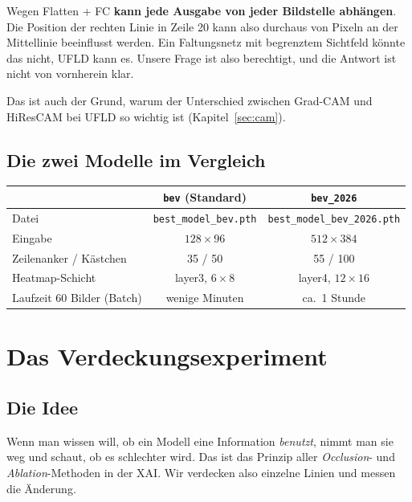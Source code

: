 \documentclass[11pt,a4paper]{article}
\newcommand{\code}[1]{\texttt{#1}}
\begin{document}
\begin{merke}
Wegen Flatten + FC \textbf{kann jede Ausgabe von jeder Bildstelle abhängen}. Die Position der
rechten Linie in Zeile 20 kann also durchaus von Pixeln an der Mittellinie beeinflusst werden.
Ein Faltungsnetz mit begrenztem Sichtfeld könnte das nicht, UFLD kann es. Unsere Frage ist also
berechtigt, und die Antwort ist nicht von vornherein klar.
\end{merke}

Das ist auch der Grund, warum der Unterschied zwischen Grad-CAM und HiResCAM bei UFLD so wichtig
ist (Kapitel~\ref{sec:cam}).

\subsection*{Die zwei Modelle im Vergleich}

\begin{center}
\begin{tabular}{lcc}
\toprule
& \code{bev} (Standard) & \code{bev\_2026} \\
\midrule
Datei & \code{best\_model\_bev.pth} & \code{best\_model\_bev\_2026.pth} \\
Eingabe & $128 \times 96$ & $512 \times 384$ \\
Zeilenanker / Kästchen & 35 / 50 & 55 / 100 \\
Heatmap-Schicht & layer3, $6\times8$ & layer4, $12\times16$ \\
Laufzeit 60 Bilder (Batch) & wenige Minuten & ca.\ 1 Stunde \\
\bottomrule
\end{tabular}
\end{center}

\section{Das Verdeckungsexperiment}
\label{sec:experiment}

\subsection{Die Idee}

Wenn man wissen will, ob ein Modell eine Information \emph{benutzt}, nimmt man sie weg und
schaut, ob es schlechter wird. Das ist das Prinzip aller \emph{Occlusion}- und
\emph{Ablation}-Methoden in der XAI. Wir verdecken also einzelne Linien und messen die Änderung.
\end{document}
